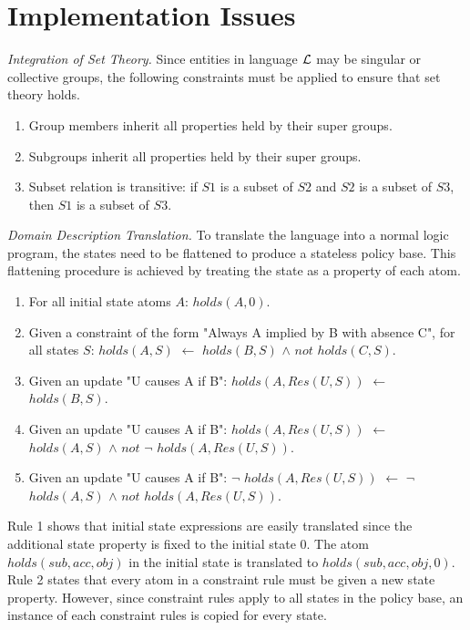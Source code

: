 \documentclass{llncs}
\begin{document}
  \section{Implementation Issues}

    \noindent
    \emph{Integration of Set Theory.} Since entities in language $\cal{L}$ may 
    be singular or collective groups, the following constraints must be applied
    to ensure that set theory holds.

    \begin{enumerate} 
      \item
        Group members inherit all properties held by their super groups.
      \item
        Subgroups inherit all properties held by their super groups.
      \item
        Subset relation is transitive: if $S1$ is a subset of $S2$ and $S2$ is
        a subset of $S3$, then $S1$ is a subset of $S3$.
    \end{enumerate}

    \noindent
    \emph{Domain Description Translation.} To translate the language into a
    normal logic program, the states need to be flattened to produce a
    stateless policy base. This flattening procedure is achieved by treating
    the state as a property of each atom.

    \begin{enumerate}
      \item
        For all initial state atoms $A$: $holds(A, 0)$.
      \item
        Given a constraint of the form "Always A implied by B with
        absence C", for all states $S$:
        $holds(A, S)$ $\leftarrow$ $holds(B, S)$ $\land$ $not$ $holds(C, S)$.
      \item
        Given an update "U causes A if B":
        $holds(A, Res(U, S))$ $\leftarrow$ $holds(B, S)$.
      \item
        Given an update "U causes A if B":
        $holds(A, Res(U, S))$ $\leftarrow$ $holds(A, S)$ $\land$ $not$ $\lnot$
        $holds(A, Res(U, S))$.
      \item
        Given an update "U causes A if B":
        $\lnot$ $holds(A, Res(U, S))$ $\leftarrow$ $\lnot$ $holds(A, S)$
        $\land$ $not$ $holds(A, Res(U, S))$.
    \end{enumerate}

    Rule 1 shows that initial state expressions are easily translated since
    the additional state property is fixed to the initial state 0. The atom
    $holds(sub, acc, obj)$ in the initial state is translated to $holds(sub,
    acc, obj, 0)$. Rule 2 states that every atom in a constraint rule must be
    given a new state property. However, since constraint rules apply to all
    states in the policy base, an instance of each constraint rules is copied
    for every state.
\end{document}
